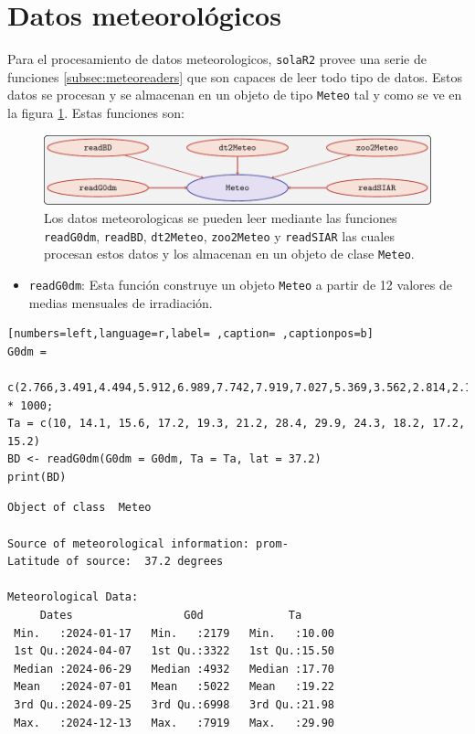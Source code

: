 \section{Datos meteorológicos}
\label{sec:orgf155322}
\label{sec:datos-meteorologicos}
Para el procesamiento de datos meteorologicos, \texttt{solaR2} provee una serie de funciones \ref{subsec:meteoreaders} que son capaces de leer todo tipo de datos. Estos datos se procesan y se almacenan en un objeto de tipo \texttt{Meteo} tal y como se ve en la figura \ref{fig:meteo}. Estas funciones son:
\begin{figure}[]
\centering
\includegraphics[keepaspectratio,width=\textwidth,height=0.5\textheight]{figuras/meteo.pdf}
\caption{Los datos meteorologicas se pueden leer mediante las funciones \texttt{readG0dm}, \texttt{readBD}, \texttt{dt2Meteo}, \texttt{zoo2Meteo} y \texttt{readSIAR} las cuales procesan estos datos y los almacenan en un objeto de clase \texttt{Meteo}. \label{fig:meteo}}
\end{figure}
\begin{itemize}
\item \texttt{readG0dm}: Esta función construye un objeto \texttt{Meteo} a partir de 12 valores de medias mensuales de irradiación.
\end{itemize}
\begin{lstlisting}[numbers=left,language=r,label= ,caption= ,captionpos=b]
G0dm =
  c(2.766,3.491,4.494,5.912,6.989,7.742,7.919,7.027,5.369,3.562,2.814,2.179) * 1000;
Ta = c(10, 14.1, 15.6, 17.2, 19.3, 21.2, 28.4, 29.9, 24.3, 18.2, 17.2, 15.2)
BD <- readG0dm(G0dm = G0dm, Ta = Ta, lat = 37.2)
print(BD)
\end{lstlisting}

\begin{verbatim}
Object of class  Meteo 

Source of meteorological information: prom- 
Latitude of source:  37.2 degrees

Meteorological Data:
     Dates                 G0d             Ta       
 Min.   :2024-01-17   Min.   :2179   Min.   :10.00  
 1st Qu.:2024-04-07   1st Qu.:3322   1st Qu.:15.50  
 Median :2024-06-29   Median :4932   Median :17.70  
 Mean   :2024-07-01   Mean   :5022   Mean   :19.22  
 3rd Qu.:2024-09-25   3rd Qu.:6998   3rd Qu.:21.98  
 Max.   :2024-12-13   Max.   :7919   Max.   :29.90
\end{verbatim}

